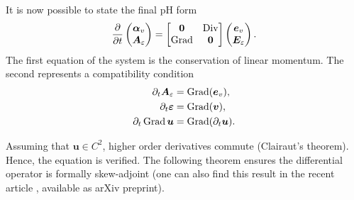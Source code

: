 It is now possible to state the final pH form
\begin{equation}
\diffp{}{t}
\begin{pmatrix}
\bm{\alpha}_v \\
\bm{A}_\varepsilon
\end{pmatrix} = 
\begin{bmatrix}
\bm{0} & \Div \\
\Grad & \bm{0} \\
\end{bmatrix}
\begin{pmatrix}
\bm{e}_v \\
\bm{E}_\varepsilon
\end{pmatrix}.
\end{equation}
The first equation of the system is the conservation of linear momentum. The second represents a compatibility condition 
\begin{equation}\label{eq:compderElas}
\begin{aligned}
\partial_t {\bm{A}_\varepsilon} &= \operatorname*{Grad}(\bm{e}_v), \\
\partial_t\bm{\varepsilon} &= \operatorname*{Grad}(\bm{v}), \\
\partial_t \operatorname*{Grad} \bm{u} &= \operatorname*{Grad}(\partial_t \bm{u}). \\
\end{aligned}
\end{equation}

Assuming that $\bm{u} \in C^2$, higher order derivatives commute (Clairaut's theorem). Hence, the equation is verified. The following theorem ensures the differential operator is formally skew-adjoint (one can also find this result in the recent article \cite[Lemma 3.3]{pauly2020elasticity}, available as arXiv preprint). 

